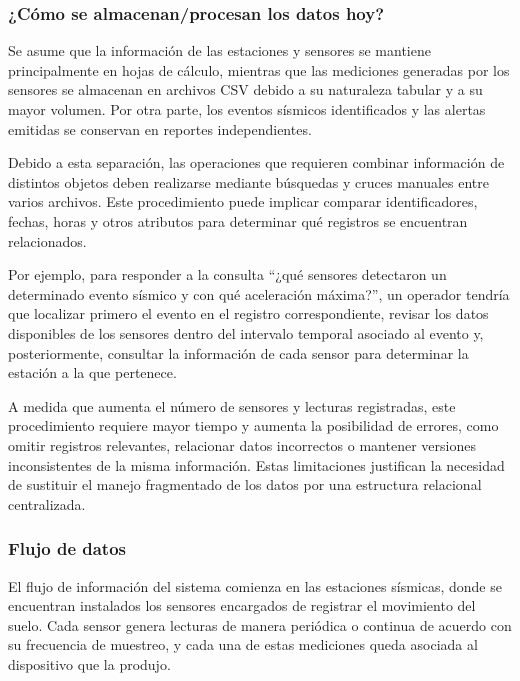 \documentclass[12pt,a4paper]{article}
\begin{document}
 


\subsubsection{¿Cómo se almacenan/procesan los datos hoy?}

Se asume que la información de las estaciones y sensores se mantiene principalmente en hojas de cálculo, mientras que las mediciones generadas por los sensores se almacenan en archivos CSV debido a su naturaleza tabular y a su mayor volumen. Por otra parte, los eventos sísmicos identificados y las alertas emitidas se conservan en reportes independientes.

Debido a esta separación, las operaciones que requieren combinar información de distintos objetos deben realizarse mediante búsquedas y cruces manuales entre varios archivos. Este procedimiento puede implicar comparar identificadores, fechas, horas y otros atributos para determinar qué registros se encuentran relacionados.

Por ejemplo, para responder a la consulta ``¿qué sensores detectaron un determinado evento sísmico y con qué aceleración máxima?'', un operador tendría que localizar primero el evento en el registro correspondiente, revisar los datos disponibles de los sensores dentro del intervalo temporal asociado al evento y, posteriormente, consultar la información de cada sensor para determinar la estación a la que pertenece.

A medida que aumenta el número de sensores y lecturas registradas, este procedimiento requiere mayor tiempo y aumenta la posibilidad de errores, como omitir registros relevantes, relacionar datos incorrectos o mantener versiones inconsistentes de la misma información. Estas limitaciones justifican la necesidad de sustituir el manejo fragmentado de los datos por una estructura relacional centralizada.

 


\subsubsection{Flujo de datos}

El flujo de información del sistema comienza en las estaciones sísmicas, donde se encuentran instalados los sensores encargados de registrar el movimiento del suelo. Cada sensor genera lecturas de manera periódica o continua de acuerdo con su frecuencia de muestreo, y cada una de estas mediciones queda asociada al dispositivo que la produjo.
\end{document}
